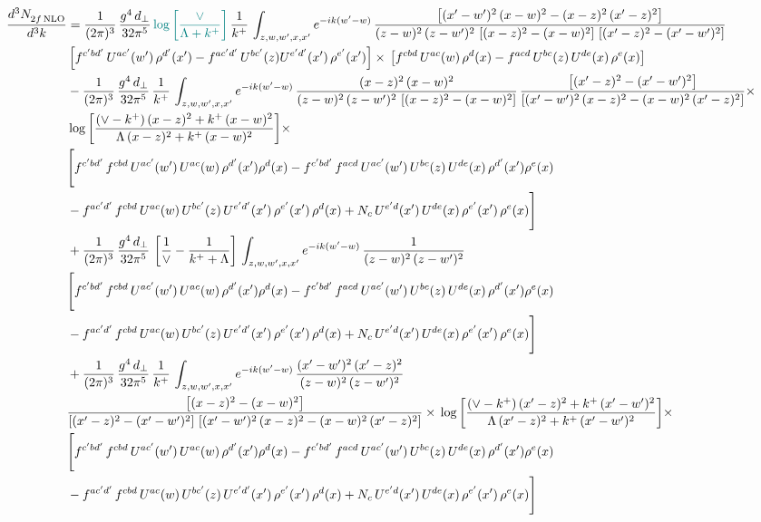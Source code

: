 \documentclass[9pt]{article}
\numberwithin{equation}{section}
\begin{document}
\begin{align}
    \frac{d^{3}N_{2f\,\rm NLO}^{\rm}}{d^{3}k}  & = \frac{1}{(2\pi)^{3}}\, \frac{g^{4}\,d_{\perp}}{32\pi^{5}}\,{\color{teal}\log{\left[\frac{\vee}{\Lambda + k^{+}}\right]}}\,\frac{1}{k^{+}}\,\int_{z,w,w^{\prime},x,x'} e^{-ik(w^{\prime}-w)}\,\frac{\left[(x'-w')^{2}\, (x-w)^{2} - (x-z)^{2}\, (x'-z)^{2}\right]}{(z-w)^{2}\, (z-w')^{2}\,\left[(x-z)^{2} - (x-w)^{2}\right]\, \left[(x'-z)^{2} - (x'-w')^{2}\right]}\notag \\ &   \left[f^{c'bd'}\, U^{ac'}(w')\,\rho^{d'}(x')-f^{ac'd'}\, U^{bc'}(z)U^{e'd'}(x')\, \rho^{e'}(x')\right]\times\, \left[f^{cbd}\, U^{ac}(w)\,\rho^{d}(x) - f^{acd}\, U^{bc}(z)\,U^{de}(x)\, \rho^{e}(x)\right] \notag \\ & - \frac{1}{(2\pi)^{3}}\, \frac{g^{4}\,d_{\perp}}{32\pi^{5}}\,\frac{1}{k^{+}}\,\int_{z,w,w^{\prime},x,x'} e^{-ik(w^{\prime}-w)}\,\frac{(x-z)^{2}\, (x-w)^{2}}{(z-w)^{2}\, (z-w')^{2}\,\left[(x-z)^{2} - (x-w)^{2}\right]}\,\frac{\left[(x'-z)^{2}-(x'-w')^{2}\right]}{\left[(x'-w')^{2}\, (x-z)^{2} - (x-w)^{2}\, (x'-z)^{2}\right]}\times\notag \\ & \log{\left[\frac{(\vee - k^{+})\, (x-z)^{2} + k^{+}\, (x-w)^{2}}{\Lambda\, (x-z)^{2} + k^{+}\, (x-w)^{2}}\right]}\times\notag \\ & \Bigg[f^{c'bd'}\,f^{cbd}\, U^{ac'}(w')\,U^{ac}(w)\,\rho^{d'}(x')\rho^{d}(x)- f^{c'bd'}\,f^{acd}\,U^{ac'}(w')\,U^{bc}(z)\,U^{de}(x)\,\rho^{d'}(x')\rho^{e}(x) \notag \\ & -f^{ac'd'}\,f^{cbd}\,U^{ac}(w)\,U^{bc'}(z)\,U^{e'd'}(x')\,\rho^{e'}(x')\,\rho^{d}(x) +N_{c}\,U^{e'd}(x')\,U^{de}(x)\,\rho^{e'}(x')\,\rho^{e}(x)\Bigg] \notag \\ & + \frac{1}{(2\pi)^{3}}\, \frac{g^{4}\,d_{\perp}}{32\pi^{5}}\,\left[\frac{1}{\vee} - \frac{1}{k^{+} + \Lambda}\right]\,\int_{z,w,w^{\prime},x,x'} e^{-ik(w^{\prime}-w)}\,\frac{1}{(z-w)^{2}\, (z-w')^{2}}\notag \\ & \Bigg[f^{c'bd'}\,f^{cbd}\, U^{ac'}(w')\,U^{ac}(w)\,\rho^{d'}(x')\rho^{d}(x)- f^{c'bd'}\,f^{acd}\,U^{ac'}(w')\,U^{bc}(z)\,U^{de}(x)\,\rho^{d'}(x')\rho^{e}(x) \notag \\ & -f^{ac'd'}\,f^{cbd}\,U^{ac}(w)\,U^{bc'}(z)\,U^{e'd'}(x')\,\rho^{e'}(x')\,\rho^{d}(x) +N_{c}\,U^{e'd}(x')\,U^{de}(x)\,\rho^{e'}(x')\,\rho^{e}(x)\Bigg] \notag \\ & + \frac{1}{(2\pi)^{3}}\, \frac{g^{4}\,d_{\perp}}{32\pi^{5}}\,\frac{1}{k^{+}}\,\int_{z,w,w^{\prime},x,x'} e^{-ik(w^{\prime}-w)}\,\frac{(x'-w')^{2}\, (x'-z)^{2}}{(z-w)^{2}\, (z-w')^{2}}\notag \\ & \frac{\left[(x-z)^{2} - (x-w)^{2}\right]}{\left[(x'-z)^{2} - (x'-w')^{2}\right]\, \left[(x'-w')^{2}\, (x - z)^{2} - (x-w)^{2}\,(x'-z)^{2}\right]}\times\, \log{\left[\frac{(\vee - k^{+})\, (x'-z)^{2} + k^{+}\, (x'-w')^{2}}{\Lambda\, (x'-z)^{2} + k^{+}\, (x'-w')^{2}}\right]}\times \notag \\ &  \Bigg[f^{c'bd'}\,f^{cbd}\, U^{ac'}(w')\,U^{ac}(w)\,\rho^{d'}(x')\rho^{d}(x)- f^{c'bd'}\,f^{acd}\,U^{ac'}(w')\,U^{bc}(z)\,U^{de}(x)\,\rho^{d'}(x')\rho^{e}(x) \notag \\ & -f^{ac'd'}\,f^{cbd}\,U^{ac}(w)\,U^{bc'}(z)\,U^{e'd'}(x')\,\rho^{e'}(x')\,\rho^{d}(x) +N_{c}\,U^{e'd}(x')\,U^{de}(x)\,\rho^{e'}(x')\,\rho^{e}(x)\Bigg]
\end{align}
\end{document}
